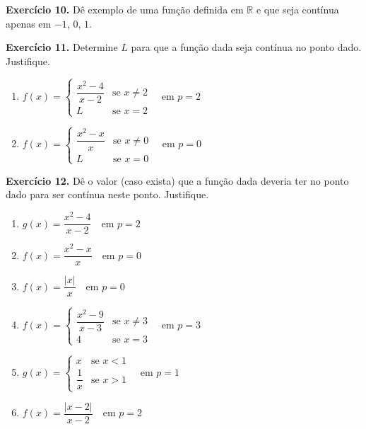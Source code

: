 \documentclass[12pt,a4paper]{article}
\begin{document}
\vspace{0.5cm}
\noindent\textbf{Exercício 10.}
Dê exemplo de uma função definida em $\mathbb{R}$ e que seja contínua apenas em $-1$, $0$, $1$.

\vspace{0.5cm}
\noindent\textbf{Exercício 11.} Determine $L$ para que a função dada seja contínua no ponto dado. Justifique.
\begin{enumerate}
    \renewcommand{\theenumi}{\alph{enumi}}
    \renewcommand{\labelenumi}{\theenumi)}
    \item $f(x) = \begin{cases} \dfrac{x^2 - 4}{x - 2} & \text{se } x \neq 2 \\ L & \text{se } x = 2 \end{cases} \quad \text{em } p = 2$
    \item $f(x) = \begin{cases} \dfrac{x^2 - x}{x} & \text{se } x \neq 0 \\ L & \text{se } x = 0 \end{cases} \quad \text{em } p = 0$
\end{enumerate}

\vspace{0.5cm}
\noindent\textbf{Exercício 12.} Dê o valor (caso exista) que a função dada deveria ter no ponto dado para ser contínua neste ponto. Justifique.
\begin{enumerate}
    \renewcommand{\theenumi}{\alph{enumi}}
    \renewcommand{\labelenumi}{\theenumi)}
    \item $g(x) = \dfrac{x^2 - 4}{x - 2} \quad \text{em } p = 2$
    \item $f(x) = \dfrac{x^2 - x}{x} \quad \text{em } p = 0$
    \item $f(x) = \dfrac{|x|}{x} \quad \text{em } p = 0$
    \item $f(x) = \begin{cases} \dfrac{x^2 - 9}{x - 3} & \text{se } x \neq 3 \\ 4 & \text{se } x = 3 \end{cases} \quad \text{em } p = 3$
    \item $g(x) = \begin{cases} x & \text{se } x < 1 \\ \dfrac{1}{x} & \text{se } x > 1 \end{cases} \quad \text{em } p = 1$
    \item $f(x) = \dfrac{|x - 2|}{x - 2} \quad \text{em } p = 2$
\end{enumerate}
\end{document}

